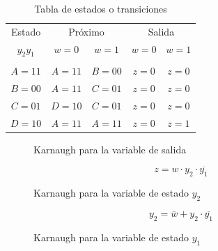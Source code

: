 \begin{table}[H]
    \centering
    \begin{tabular}{c  c c  c c}
        Estado & \multicolumn{2}{c}{Pr\'oximo} & \multicolumn{2}{c}{Salida} \\
        $y_2 y_1$ & $w = 0$ & $w = 1$ & $w = 0$ & $w = 1$ \\
        \hline \\
        $A=11$ & $A=11$ & $B=00$ & $z=0$ & $z=0$ \\
        $B=00$ & $A=11$ & $C=01$ & $z=0$ & $z=0$ \\
        $C=01$ & $D=10$ & $C=01$ & $z=0$ & $z=0$ \\
        $D=10$ & $A=11$ & $A=11$ & $z=0$ & $z=1$ \\
        \hline
    \end{tabular}    
    \caption{Tabla de estados o transiciones}
    \label{table:tabla_estados_ejercicio_2}
\end{table}

\begin{figure}[H]
    \centering
    \begin{Karnaughvuit}
    \end{Karnaughvuit}
    \caption{Karnaugh para la variable de salida}
\end{figure}

\begin{equation}
    z = w \cdot y_2 \cdot \overline{y_1}
\end{equation}

\begin{figure}[H]
    \centering
    \begin{Karnaughvuit}
    \end{Karnaughvuit}
    \caption{Karnaugh para la variable de estado $y_2$}
\end{figure}

\begin{equation}
    y_2 = \overline{w} + y_2 \cdot \overline{y_1}
\end{equation}

\begin{figure}[H]
    \centering
    \begin{Karnaughvuit}
    \end{Karnaughvuit}
    \caption{Karnaugh para la variable de estado $y_1$}
\end{figure}

